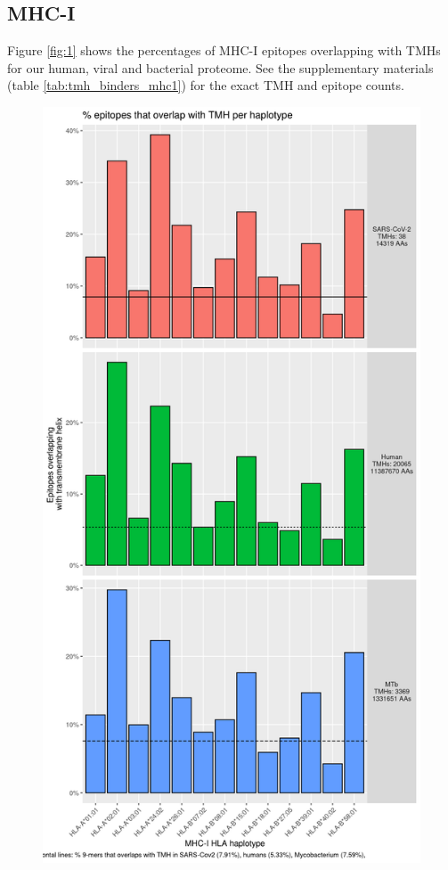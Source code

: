 \subsection{MHC-I}

Figure \ref{fig:1} shows the percentages of MHC-I epitopes overlapping 
with TMHs for our human, viral and bacterial proteome.
See the supplementary materials (table \ref{tab:tmh_binders_mhc1}) 
for the exact TMH and epitope counts.

\begin{figure}[!htbp]
  \includegraphics[height=0.9\textheight]{bbbq_1_smart_results/fig_f_tmh_mhc1_2_grid.png}

\end{figure}
